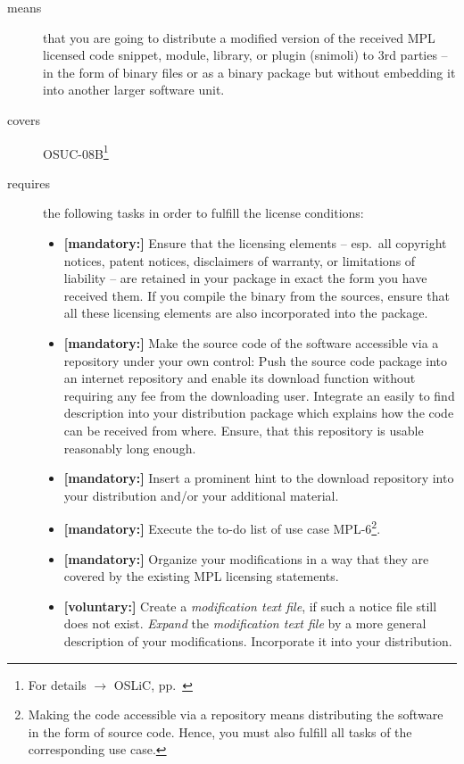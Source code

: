 \begin{description}
\item[means] that you are going to distribute a modified version of the received
MPL licensed code snippet, module, library, or plugin (snimoli) to 3rd parties
-- in the form of binary files or as a binary package but without embedding it
into another larger software unit.
\item[covers] OSUC-08B\footnote{For details $\rightarrow$ OSLiC, pp.\
\pageref{OSUC-08B-DEF}}
\item[requires] the following tasks in order to fulfill the license conditions:
\begin{itemize}

  \item \textbf{[mandatory:]} Ensure that the licensing elements -- esp.\ all
  copyright notices, patent notices, disclaimers of warranty, or limitations of
  liability -- are retained in your package in exact the form you have received
  them. If you compile the binary from the sources, ensure that all these
  licensing elements are also incorporated into the package.

  \item \textbf{[mandatory:]} Make the source code of the software accessible
  via a repository under your own control: Push the source code package into an
  internet repository and enable its download function without requiring any fee
  from the downloading user. Integrate an easily to find description into your
  distribution package which explains how the code can be received from where.
  Ensure, that this repository is usable reasonably long enough.
  
  \item \textbf{[mandatory:]} Insert a prominent hint to the download repository
  into your distribution and/or your additional material.

  \item \textbf{[mandatory:]} Execute the to-do list of use case MPL-6\footnote{
  Making the code accessible via a repository means distributing the software in
  the form of source code. Hence, you must also fulfill all tasks of the
  corresponding use case.}.
  
  \item \textbf{[mandatory:]} Organize your modifications in a way that they are
  covered by the existing MPL licensing statements.
  
  \item \textbf{[voluntary:]} Create a \emph{modification text file}, if such a
  notice file still does not exist. \emph{Expand} the \emph{modification text
  file} by a more general description of your modifications. Incorporate it into
  your distribution.
  

\end{itemize}
\end{description}
